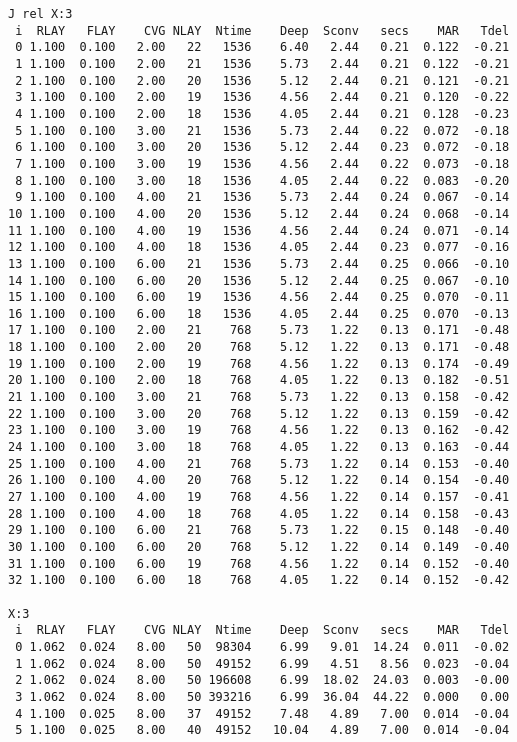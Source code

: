 \documentclass{article}
\begin{document}
\begin{table} \caption[KRC runs J and X]{KRC runs J and X. See Table \ref{runH} caption}  \label{runJ}
\begin{verbatim}
J rel X:3
 i  RLAY   FLAY    CVG NLAY  Ntime    Deep  Sconv   secs    MAR   Tdel
 0 1.100  0.100   2.00   22   1536    6.40   2.44   0.21  0.122  -0.21
 1 1.100  0.100   2.00   21   1536    5.73   2.44   0.21  0.122  -0.21
 2 1.100  0.100   2.00   20   1536    5.12   2.44   0.21  0.121  -0.21
 3 1.100  0.100   2.00   19   1536    4.56   2.44   0.21  0.120  -0.22
 4 1.100  0.100   2.00   18   1536    4.05   2.44   0.21  0.128  -0.23
 5 1.100  0.100   3.00   21   1536    5.73   2.44   0.22  0.072  -0.18
 6 1.100  0.100   3.00   20   1536    5.12   2.44   0.23  0.072  -0.18
 7 1.100  0.100   3.00   19   1536    4.56   2.44   0.22  0.073  -0.18
 8 1.100  0.100   3.00   18   1536    4.05   2.44   0.22  0.083  -0.20
 9 1.100  0.100   4.00   21   1536    5.73   2.44   0.24  0.067  -0.14
10 1.100  0.100   4.00   20   1536    5.12   2.44   0.24  0.068  -0.14
11 1.100  0.100   4.00   19   1536    4.56   2.44   0.24  0.071  -0.14
12 1.100  0.100   4.00   18   1536    4.05   2.44   0.23  0.077  -0.16
13 1.100  0.100   6.00   21   1536    5.73   2.44   0.25  0.066  -0.10
14 1.100  0.100   6.00   20   1536    5.12   2.44   0.25  0.067  -0.10
15 1.100  0.100   6.00   19   1536    4.56   2.44   0.25  0.070  -0.11
16 1.100  0.100   6.00   18   1536    4.05   2.44   0.25  0.070  -0.13
17 1.100  0.100   2.00   21    768    5.73   1.22   0.13  0.171  -0.48
18 1.100  0.100   2.00   20    768    5.12   1.22   0.13  0.171  -0.48
19 1.100  0.100   2.00   19    768    4.56   1.22   0.13  0.174  -0.49
20 1.100  0.100   2.00   18    768    4.05   1.22   0.13  0.182  -0.51
21 1.100  0.100   3.00   21    768    5.73   1.22   0.13  0.158  -0.42
22 1.100  0.100   3.00   20    768    5.12   1.22   0.13  0.159  -0.42
23 1.100  0.100   3.00   19    768    4.56   1.22   0.13  0.162  -0.42
24 1.100  0.100   3.00   18    768    4.05   1.22   0.13  0.163  -0.44
25 1.100  0.100   4.00   21    768    5.73   1.22   0.14  0.153  -0.40
26 1.100  0.100   4.00   20    768    5.12   1.22   0.14  0.154  -0.40
27 1.100  0.100   4.00   19    768    4.56   1.22   0.14  0.157  -0.41
28 1.100  0.100   4.00   18    768    4.05   1.22   0.14  0.158  -0.43
29 1.100  0.100   6.00   21    768    5.73   1.22   0.15  0.148  -0.40
30 1.100  0.100   6.00   20    768    5.12   1.22   0.14  0.149  -0.40
31 1.100  0.100   6.00   19    768    4.56   1.22   0.14  0.152  -0.40
32 1.100  0.100   6.00   18    768    4.05   1.22   0.14  0.152  -0.42

X:3 
 i  RLAY   FLAY    CVG NLAY  Ntime    Deep  Sconv   secs    MAR   Tdel
 0 1.062  0.024   8.00   50  98304    6.99   9.01  14.24  0.011  -0.02
 1 1.062  0.024   8.00   50  49152    6.99   4.51   8.56  0.023  -0.04
 2 1.062  0.024   8.00   50 196608    6.99  18.02  24.03  0.003  -0.00
 3 1.062  0.024   8.00   50 393216    6.99  36.04  44.22  0.000   0.00
 4 1.100  0.025   8.00   37  49152    7.48   4.89   7.00  0.014  -0.04
 5 1.100  0.025   8.00   40  49152   10.04   4.89   7.00  0.014  -0.04
\end{verbatim}
\vspace{-3.0mm}
\hrulefill \end{table}  
\end{document}
